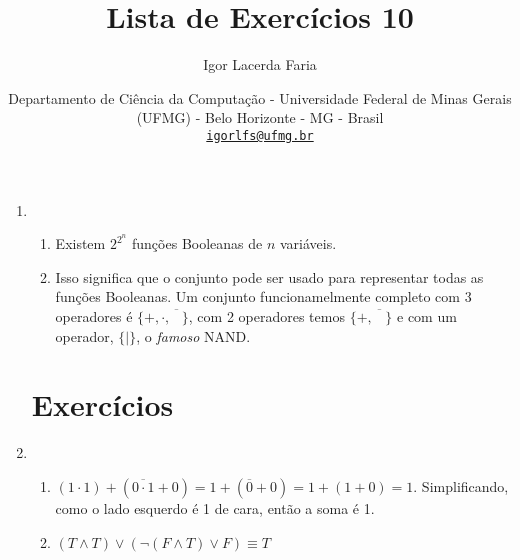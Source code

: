 \documentclass{article}
\author{Igor Lacerda Faria}
\begin{document}
\title{\textbf{Lista de Exercícios 10}}

\date{%
Departamento de Ciência da Computação - Universidade Federal de Minas Gerais (UFMG) - Belo Horizonte - MG - Brasil \\ [3ex]
\href{mailto:igorlfs@ufmg.br}{\nolinkurl{igorlfs@ufmg.br}}
}

\maketitle

\begin{enumerate}

	\section*{Revisão}

	\item

	      \begin{enumerate}

		      \item Existem \( 2^{2^n} \) funções Booleanas de \( n \) variáveis.

		      \item Isso significa que o conjunto pode ser usado para representar todas as funções Booleanas. Um conjunto funcionamelmente completo com 3 operadores é \( \{+,\cdot,\overline{\phantom{A}} \} \), com 2 operadores temos \( \{+, \overline{\phantom{X}}\} \) e com um operador, \( \{\mid\} \), o \textit{famoso} NAND.

	      \end{enumerate}

	      \section*{Exercícios}

	\item
	      \begin{enumerate}

		      \item  \( (1 \cdot 1 ) + (\overline{0 \cdot 1 } + 0) = 1 + (\overline{0} + 0) = 1 + (1 + 0) = 1 \). Simplificando, como o lado esquerdo é 1 de cara, então a soma é 1.

		      \item \( (T \land T ) \lor (\neg (F \land T) \lor F) \equiv T\)

	      \end{enumerate}


\end{enumerate}
\end{document}
